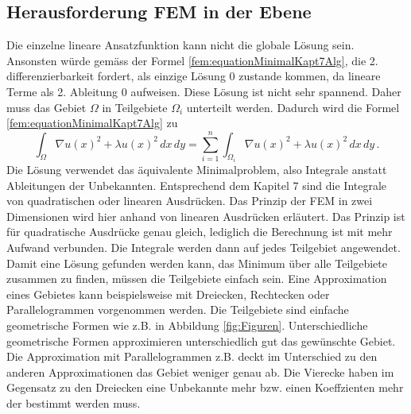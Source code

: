 \subsection{Herausforderung FEM in der Ebene}
Die einzelne lineare Ansatzfunktion kann nicht die globale Lösung sein. Ansonsten würde gemäss der Formel \eqref{fem:equationMinimalKapt7Alg}, die 2. differenzierbarkeit fordert, als einzige Lösung 0 zustande kommen, da lineare Terme als 2. Ableitung 0 aufweisen. Diese Lösung ist nicht sehr spannend. Daher muss das Gebiet $\Omega$ in Teilgebiete $\Omega_i$ unterteilt werden. Dadurch wird die Formel \eqref{fem:equationMinimalKapt7Alg} zu
\begin{equation}
\int_{\Omega} \nabla u(x)^2 + \lambda u(x)^2 \, dx \, dy = \sum \limits_{i=1}^n \int_{\Omega_i} \nabla u(x)^2 + \lambda u(x)^2 \, dx \, dy \, .
\label{fem:equationSummGebiete}
\end{equation}
Die Lösung verwendet das äquivalente Minimalproblem, also Integrale anstatt Ableitungen der Unbekannten. Entsprechend dem Kapitel 7 sind die Integrale von quadratischen oder linearen Ausdrücken. Das Prinzip der FEM in zwei Dimensionen wird hier anhand von linearen Ausdrücken erläutert. Das Prinzip ist für quadratische Ausdrücke genau gleich, lediglich die Berechnung ist mit mehr Aufwand verbunden. Die Integrale werden dann auf jedes Teilgebiet angewendet. \\
Damit eine Lösung gefunden werden kann, das Minimum über alle Teilgebiete zusammen zu finden, müssen die Teilgebiete einfach sein. Eine Approximation eines Gebietes kann beispielsweise mit Dreiecken, Rechtecken oder Parallelogrammen vorgenommen werden. Die Teilgebiete sind einfache geometrische Formen wie z.B. in Abbildung \ref{fig:Figuren}. Unterschiedliche geometrische Formen approximieren unterschiedlich gut das gewünschte Gebiet. Die Approximation mit Parallelogrammen z.B. deckt im Unterschied zu den anderen Approximationen das Gebiet weniger genau ab. Die Vierecke haben im Gegensatz zu den Dreiecken eine Unbekannte mehr bzw. einen Koeffzienten mehr der bestimmt werden  muss.
